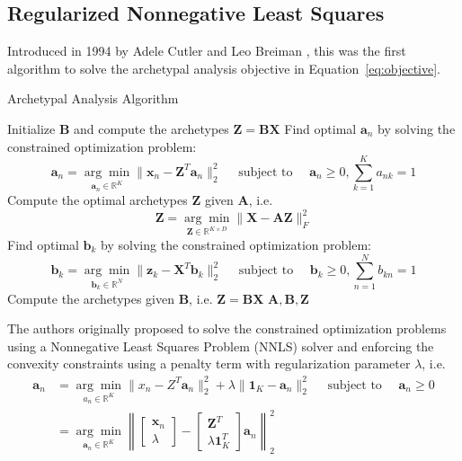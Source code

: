 \documentclass[oneside]{article}
\begin{document}
\subsection{Regularized Nonnegative Least Squares}

Introduced in 1994 by Adele Cutler and Leo Breiman \autocite{cutlerArchetypalAnalysis1994}, this was the first algorithm to solve the archetypal analysis objective in Equation~\eqref{eq:objective}.

\begin{algorithm}
\caption{Archetypal Analysis Algorithm}
\begin{algorithmic}[1]
\State Initialize $\mathbf{B}$ and compute the archetypes $\mathbf{Z} = \mathbf{B} \mathbf{X}$
        \State Find optimal $\mathbf{a}_n$ by solving the constrained optimization problem:
        $$\mathbf{a}_n = \underset{\mathbf{a}_n \in \mathbb{R}^K}{\arg \min} \|\mathbf{x}_n - \mathbf{Z}^T \mathbf{a}_n\|_2^2 \quad \text{ subject to } \quad \mathbf{a}_n \geq 0, \sum_{k=1}^K a_{nk} = 1$$
    \EndFor
    \State Compute the optimal archetypes $\mathbf{Z}$ given $\mathbf{A}$, i.e.
    $$\mathbf{Z} = \underset{\mathbf{Z} \in \mathbb{R}^{K \times D}}{\arg \min} \| \mathbf{X} - \mathbf{A} \mathbf{Z}\|_F^2$$
        \State Find optimal $\mathbf{b}_k$ by solving the constrained optimization problem:
        $$\mathbf{b}_k = \underset{\mathbf{b}_k \in \mathbb{R}^N}{\arg \min} \|\mathbf{z}_k - \mathbf{X}^T \mathbf{b}_k\|_2^2 \quad \text{ subject to } \quad \mathbf{b}_k \geq 0, \sum_{n=1}^N b_{kn} = 1$$
    \EndFor
    \State Compute the archetypes given $\mathbf{B}$, i.e. $\mathbf{Z}=\mathbf{B}\mathbf{X}$
\EndWhile
\State \Return $\mathbf{A}, \mathbf{B}, \mathbf{Z}$
\end{algorithmic}
\end{algorithm}

The authors originally proposed to solve the constrained optimization problems using a Nonnegative Least Squares Problem (NNLS) solver and enforcing the convexity constraints using a penalty term with regularization parameter $\lambda$, i.e.
\begin{equation}
\begin{aligned}
\mathbf{a}_n &= \underset{a_n \in \mathbb{R}^K}{\arg \min} \|x_n - Z^T \mathbf{a}_n\|_2^2 + \lambda \| \mathbf{1}_K - \mathbf{a}_n \|_2^2 \quad \text{ subject to } \quad \mathbf{a}_n \geq 0 \\
&= \underset{\mathbf{a}_n \in \mathbb{R}^K}{\arg \min} \left\| \begin{bmatrix} \mathbf{x}_n \\ \lambda \end{bmatrix} -  \begin{bmatrix} \mathbf{Z}^T \\ \lambda \mathbf{1}_K^T \end{bmatrix} \mathbf{a}_n \right\|_2^2
\end{aligned}
\end{equation}
\end{document}

